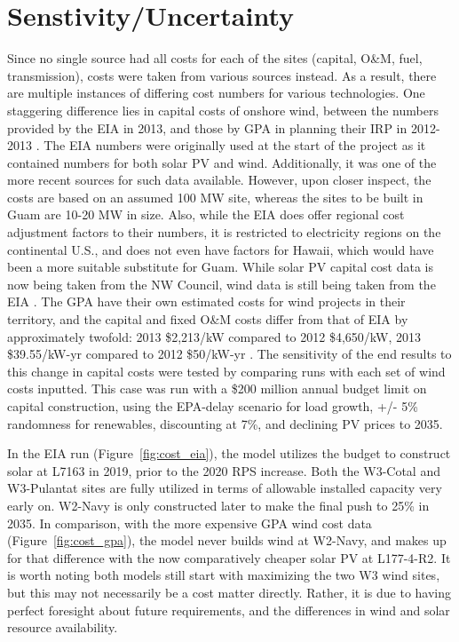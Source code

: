 \documentclass[12pt,letterpaper,fleqn]{article}
\begin{document}
\section{Senstivity/Uncertainty}

Since no single source had all costs for each of the sites (capital,
O\&M, fuel, transmission), costs were taken from various sources
instead. As a result, there are multiple instances of differing cost
numbers for various technologies. One staggering difference lies in
capital costs of onshore wind, between the numbers provided by the EIA
in 2013, and those by GPA in planning their IRP in 2012-2013
\cite{eia13, cruz13}. The EIA numbers were originally used at the
start of the project as it contained numbers for both solar PV and
wind. Additionally, it was one of the more recent sources for such
data available. However, upon closer inspect, the costs are based on
an assumed 100 MW site, whereas the sites to be built in Guam are
10-20 MW in size. Also, while the EIA does offer regional cost
adjustment factors to their numbers, it is restricted to electricity
regions on the continental U.S., and does not even have factors for
Hawaii, which would have been a more suitable substitute for
Guam. While solar PV capital cost data is now being taken from the NW
Council, wind data is still being taken from the EIA
\cite{simmons13}. The GPA have their own estimated costs for wind
projects in their territory, and the capital and fixed O\&M costs
differ from that of EIA by approximately twofold: 2013 \$2,213/kW
compared to 2012 \$4,650/kW, 2013 \$39.55/kW-yr compared to 2012
\$50/kW-yr \cite{eia13, cruz13}. The sensitivity of the end results to
this change in capital costs were tested by comparing runs with each
set of wind costs inputted. This case was run with a \$200 million
annual budget limit on capital construction, using the EPA-delay
scenario for load growth, +/- 5\% randomness for renewables,
discounting at 7\%, and declining PV prices to 2035.

In the EIA run (Figure~\ref{fig:cost_eia}), the model utilizes the
budget to construct solar at L7163 in 2019, prior to the 2020 RPS
increase. Both the W3-Cotal and W3-Pulantat sites are fully utilized
in terms of allowable installed capacity very early on. W2-Navy is
only constructed later to make the final push to 25\% in 2035. In
comparison, with the more expensive GPA wind cost data
(Figure~\ref{fig:cost_gpa}), the model never builds wind at W2-Navy,
and makes up for that difference with the now comparatively cheaper
solar PV at L177-4-R2. It is worth noting both models still start with
maximizing the two W3 wind sites, but this may not necessarily be a
cost matter directly. Rather, it is due to having perfect foresight
about future requirements, and the differences in wind and solar
resource availability.
\end{document}
